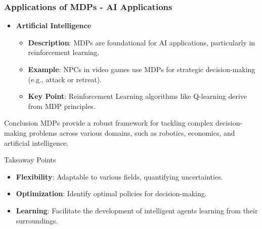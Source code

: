 \documentclass{beamer}
\begin{document}
\begin{frame}[fragile]
    \frametitle{Applications of MDPs - AI Applications}
    \begin{itemize}
        \item \textbf{Artificial Intelligence}
        \begin{itemize}
            \item \textbf{Description}: MDPs are foundational for AI applications, particularly in reinforcement learning.
            \item \textbf{Example}: NPCs in video games use MDPs for strategic decision-making (e.g., attack or retreat).
            \item \textbf{Key Point}: Reinforcement Learning algorithms like Q-learning derive from MDP principles.
        \end{itemize}
    \end{itemize}

    \begin{block}{Conclusion}
        MDPs provide a robust framework for tackling complex decision-making problems across various domains, such as robotics, economics, and artificial intelligence.
    \end{block}

    \begin{block}{Takeaway Points}
        \begin{itemize}
            \item \textbf{Flexibility}: Adaptable to various fields, quantifying uncertainties.
            \item \textbf{Optimization}: Identify optimal policies for decision-making.
            \item \textbf{Learning}: Facilitate the development of intelligent agents learning from their surroundings.
        \end{itemize}
    \end{block}
\end{frame}
\end{document}
